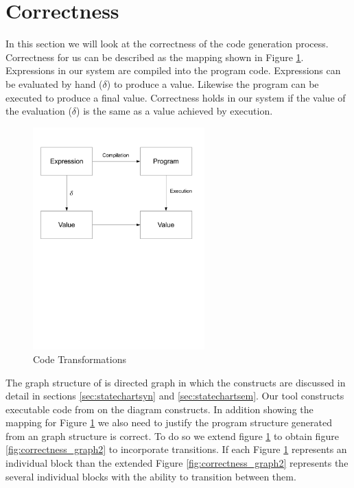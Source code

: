 \section{Correctness}

In this section we will look at the correctness of the code generation process. Correctness for us can be described as the mapping shown in Figure \ref{fig:correctness_graph1}. Expressions in our system are compiled into the program code. Expressions can be evaluated by hand ($\delta$) to produce a value. Likewise the program can be executed to produce a final value. Correctness holds in our system if the value of the evaluation ($\delta$) is the same as a value achieved by execution.

\begin{figure}[htb]
    \centering
    \includegraphics[trim= 10mm 120mm 10mm 10mm, clip, width=250px]{./images/correctness_graph1.pdf}
    \caption{Code Transformations}
    \label{fig:correctness_graph1}
\end{figure}

The graph structure of \plccharts is directed graph in which the constructs are discussed in detail in sections \ref{sec:statechartsyn} and \ref{sec:statechartsem}. Our tool constructs executable code from on the diagram constructs.  In addition showing the mapping for Figure \ref{fig:correctness_graph1} we also need to justify the program structure generated from an graph structure is correct. To do so we extend figure \ref{fig:correctness_graph1} to obtain figure \ref{fig:correctness_graph2} to incorporate transitions. If each Figure \ref{fig:correctness_graph1} represents an individual block than the extended Figure \ref{fig:correctness_graph2} represents the several individual blocks with the ability to transition between them.

